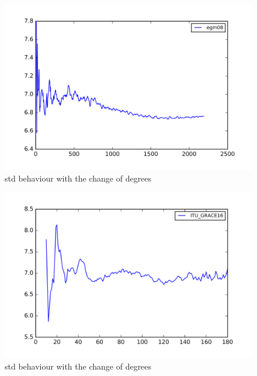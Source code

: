       
      \begin{figure}[t]
      	\caption{std behaviour with the change of degrees}
      	\label{egm2008_figure}
      	\includegraphics{Figures/egm08_figure.png}
      	\centering
      \end{figure}
      
      
      \begin{figure}[t]
      	\caption{std behaviour with the change of degrees}
      	\label{itu_grace16_figure}
      	\includegraphics{Figures/ITU_GRACE16_figure.png}
      	\centering
      \end{figure}
      
